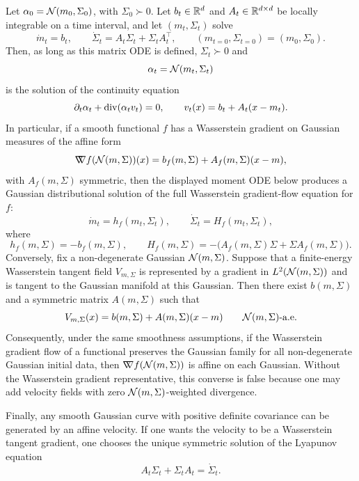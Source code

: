 \begin{prop}\label{prop-gaussian-affine-closure}
	Let $\alpha_0=\mathcal{N}(m_0,\Sigma_0)$, with $\Sigma_0\succ0$. Let $b_t\in\mathbb{R}^d$ and $A_t\in\mathbb{R}^{d\times d}$ be locally integrable on a time interval, and let $(m_t,\Sigma_t)$ solve
	\[
		\dot m_t=b_t,
		\qquad
		\dot\Sigma_t=A_t\Sigma_t+\Sigma_tA_t^\top,
		\qquad
		(m_{t=0},\Sigma_{t=0})=(m_0,\Sigma_0).
	\]
	Then, as long as this matrix ODE is defined, $\Sigma_t\succ0$ and
	\[
		\alpha_t=\mathcal{N}(m_t,\Sigma_t)
	\]
	is the solution of the continuity equation
	\[
		\partial_t\alpha_t+\operatorname{div}(\alpha_t v_t)=0,
		\qquad
		v_t(x)=b_t+A_t(x-m_t).
	\]
	In particular, if a smooth functional $f$ has a Wasserstein gradient on Gaussian measures of the affine form
	\[
		\mathord{\nabla\mkern-9.3mu\nabla} f(\mathcal{N}(m,\Sigma))(x)
		=
		b_f(m,\Sigma)+A_f(m,\Sigma)(x-m),
	\]
	with $A_f(m,\Sigma)$ symmetric, then the displayed moment ODE below produces a Gaussian distributional solution of the full Wasserstein gradient-flow equation for $f$:
	\[
		\dot m_t=h_f(m_t,\Sigma_t),
		\qquad
		\dot\Sigma_t=H_f(m_t,\Sigma_t),
	\]
	where
	\[
		h_f(m,\Sigma)=-b_f(m,\Sigma),
		\qquad
		H_f(m,\Sigma)
		=
		-\bigl(A_f(m,\Sigma)\Sigma+\Sigma A_f(m,\Sigma)\bigr).
	\]
	Conversely, fix a non-degenerate Gaussian \(\mathcal{N}(m,\Sigma)\). Suppose that a finite-energy Wasserstein tangent field \(V_{m,\Sigma}\) is represented by a gradient in \(L^2(\mathcal{N}(m,\Sigma))\) and is tangent to the Gaussian manifold at this Gaussian. Then there exist \(b(m,\Sigma)\) and a symmetric matrix \(A(m,\Sigma)\) such that
	\[
		V_{m,\Sigma}(x)=b(m,\Sigma)+A(m,\Sigma)(x-m)
		\qquad
		\mathcal{N}(m,\Sigma)\text{-a.e.}
	\]
	Consequently, under the same smoothness assumptions, if the Wasserstein gradient flow of a functional preserves the Gaussian family for all non-degenerate Gaussian initial data, then \(\mathord{\nabla\mkern-9.3mu\nabla} f(\mathcal{N}(m,\Sigma))\) is affine on each Gaussian. Without the Wasserstein gradient representative, this converse is false because one may add velocity fields with zero \(\mathcal{N}(m,\Sigma)\)-weighted divergence.

	Finally, any smooth Gaussian curve with positive definite covariance can be generated by an affine velocity. If one wants the velocity to be a Wasserstein tangent gradient, one chooses the unique symmetric solution of the Lyapunov equation
	\[
		A_t\Sigma_t+\Sigma_t A_t=\dot\Sigma_t.
	\]
\end{prop}

